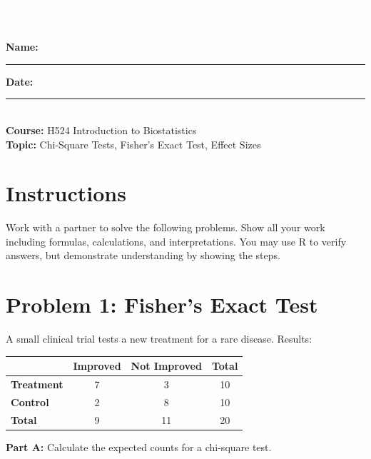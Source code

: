 \documentclass[11pt]{article}
\title{}
\author{}
\date{}
\begin{document}
\begin{tcolorbox}[colback=osaorange,colframe=black,boxrule=2pt,arc=0pt,left=6pt,right=6pt,top=10pt,bottom=10pt]
\centering
\textcolor{white}{\textbf{\Large Week 8 In-Class Worksheet}}\\
\textcolor{white}{\textbf{\large Contingency Tables and Chi-Square Tests}}
\end{tcolorbox}

\vspace{8pt}

\noindent\textbf{Name:} \rule{8cm}{0.4pt} \hfill \textbf{Date:} \rule{4cm}{0.4pt}\\[0.5ex]
\textbf{Course:} H524 Introduction to Biostatistics\\
\textbf{Topic:} Chi-Square Tests, Fisher's Exact Test, Effect Sizes

\vspace{8pt}

\section*{Instructions}
Work with a partner to solve the following problems. Show all your work including formulas, calculations, and interpretations. You may use R to verify answers, but demonstrate understanding by showing the steps.

\vspace{12pt}

\section{Problem 1: Fisher's Exact Test}

A small clinical trial tests a new treatment for a rare disease. Results:

\begin{center}
\begin{tabular}{l|cc|c}
& \textbf{Improved} & \textbf{Not Improved} & \textbf{Total} \\
\hline
\textbf{Treatment} & 7 & 3 & 10 \\
\textbf{Control} & 2 & 8 & 10 \\
\hline
\textbf{Total} & 9 & 11 & 20 \\
\end{tabular}
\end{center}

\vspace{6pt}

\textbf{Part A:} Calculate the expected counts for a chi-square test.
\end{document}

